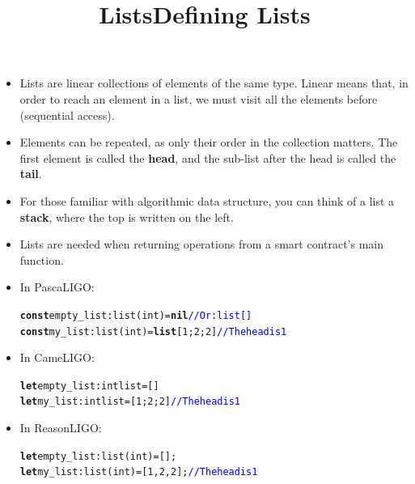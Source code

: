 \documentclass[wide]{slides}
\newcommand{\Kconst}[0]{\textbf{const}\xspace}
\newcommand{\Klist}[0]{\textbf{list}\xspace}
\newcommand{\Knil}[0]{\textbf{nil}\xspace}
\newcommand{\Klet}[0]{\textbf{let}\xspace}
\newcommand{\com}[1]{\textcolor{blue}{{#1}}}
\begin{document}
\begin{slide}
  \title{Lists}

  \begin{itemize}

    \item Lists are linear collections of elements of the same
      type. Linear means that, in order to reach an element in a list,
      we must visit all the elements before (sequential
      access).

    \item Elements can be repeated, as only their order in the
      collection matters. The first element is called the
      \textbf{head}, and the sub-list after the head is called the
      \textbf{tail}.

    \item For those familiar with algorithmic data structure, you can
      think of a list a \textbf{stack}, where the top is written on
      the left.

    \item Lists are needed when returning operations from a smart
      contract's main function.

  \end{itemize}

\end{slide}


\begin{slide}
  \title{Defining Lists}

  \begin{itemize}

    \item In PascaLIGO:
      \begin{alltt}
\Kconst empty_list : list (int) = \Knil          \com{// Or: list []}
\Kconst my_list : list (int) = \Klist [1; 2; 2] \com{// The head is 1}
      \end{alltt}

    \item In CameLIGO:
      \begin{alltt}
\Klet empty_list : int list = []
\Klet my_list : int list = [1; 2; 2] \com{// The head is 1}
      \end{alltt}

    \item In ReasonLIGO:
      \begin{alltt}
\Klet empty_list : list (int) = [];
\Klet my_list : list (int) = [1, 2, 2]; \com{// The head is 1}
      \end{alltt}

  \end{itemize}

\end{slide}
\end{document}
